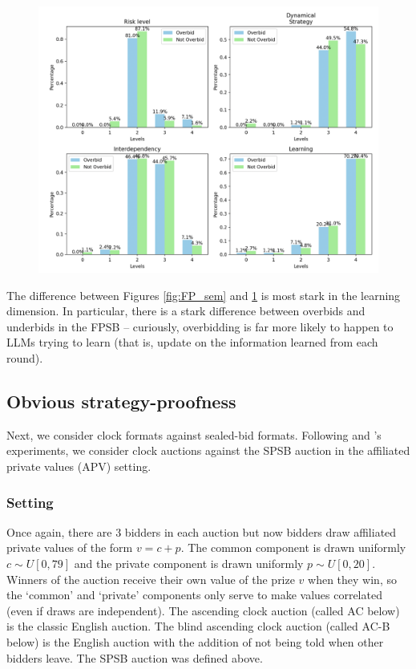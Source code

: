 \documentclass{article} %
\begin{document}
\begin{figure}[h!]
    \centering \includegraphics[width=0.8\linewidth]{Figs/SP_semantic.png}
    \caption{}
    \label{fig:SP_sem}
\end{figure}

The difference between Figures \ref{fig:FP_sem} and \ref{fig:SP_sem} is most stark in the learning dimension. In particular, there is a stark difference between overbids and underbids in the FPSB -- curiously, overbidding is far more likely to happen to LLMs trying to learn (that is, update on the information learned from each round).

\subsection{Obvious strategy-proofness}\label{session:OSP}
Next, we consider clock formats against sealed-bid formats. Following \cite{li2017obviously} and \cite{breitmoser2022obviousness}'s experiments, we consider clock auctions against the SPSB auction in the affiliated private values (APV) setting. 

\subsubsection{Setting}
Once again, there are $3$ bidders in each auction but now bidders draw affiliated private values of the form $v = c + p$. The common component is drawn uniformly $c \sim U[0, 79]$ and the private component is drawn uniformly $p \sim U[0, 20]$. Winners of the auction receive their own value of the prize $v$ when they win, so the `common' and `private' components only serve to make values correlated (even if draws are independent). The ascending clock auction (called AC below) is the classic English auction. The blind ascending clock auction (called AC-B below) is the English auction with the addition of not being told when other bidders leave. The SPSB auction was defined above. 
\end{document}
